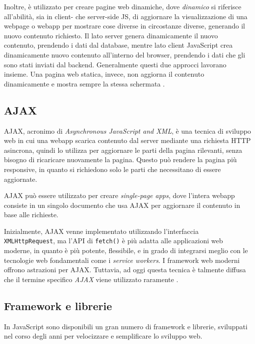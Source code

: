 Inoltre, è utilizzato per creare pagine web dinamiche, dove \textit{dinamico} si riferisce all'abilità, sia in client- che server-side JS, di aggiornare la visualizzazione di una webpage o webapp per mostrare cose diverse in circostanze diverse, generando il nuovo contenuto richiesto. Il lato server genera dinamicamente il nuovo contenuto, prendendo i dati dal database, mentre lato client JavaScript crea dinamicamente nuovo contenuto all'interno del browser, prendendo i dati che gli sono stati inviati dal backend. Generalmente questi due approcci lavorano insieme. Una pagina web statica, invece, non aggiorna il contenuto dinamicamente e mostra sempre la stessa schermata \cite{JavaScript}.

\subsection{AJAX}
AJAX, acronimo di \textit{Asynchronous JavaScript and XML}, è una tecnica di sviluppo web in cui una webapp scarica contenuto dal server mediante una richiesta HTTP asincrona, quindi lo utilizza per aggiornare le parti della pagina rilevanti, senza bisogno di ricaricare nuovamente la pagina. Questo può rendere la pagina più responsive, in quanto si richiedono solo le parti che necessitano di essere aggiornate.

AJAX può essere utilizzato per creare \textit{single-page apps}, dove l'intera webapp consiste in un singolo documento che usa AJAX per aggiornare il contenuto in base alle richieste.

Inizialmente, AJAX venne implementato utilizzando l'interfaccia \\\Verb_XMLHttpRequest_, ma l'API di \Verb_fetch()_ è più adatta alle applicazioni web moderne, in quanto è più potente, flessibile, e in grado di integrarsi meglio con le tecnologie web fondamentali come i \textit{service workers}. I framework web moderni offrono astrazioni per AJAX. Tuttavia, ad oggi questa tecnica è talmente diffusa che il termine specifico \textit{AJAX} viene utilizzato raramente \cite{AJAX}.

\subsection{Framework e librerie}
In JavaScript sono disponibili un gran numero di framework e librerie, sviluppati nel corso degli anni per velocizzare e semplificare lo sviluppo web.

